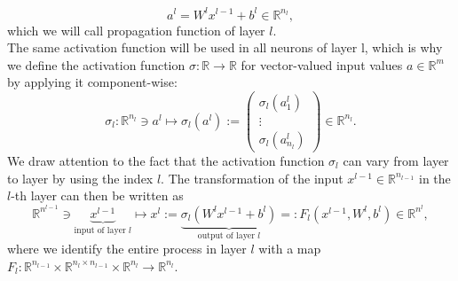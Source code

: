 \begin{equation}
    \label{propagation function}
    a^l = W^l x^{l-1} + b^l \in \mathbb{R}^{n_l},
\end{equation}
which we will call propagation function of layer $l$. \\
The same activation function will be used in all neurons of layer l, which is why we define the activation function $\sigma \colon \mathbb{R} \to \mathbb{R}$ for vector-valued input values $a \in \mathbb{R}^m$ by applying it component-wise:
\begin{equation*}
    \sigma_l \colon \mathbb{R}^{n_l} \ni a^l \mapsto \sigma_l (a^l):= \left(
        \begin{array}
            {c} \sigma_l \left( a^l_{1} \right) \\
            \vdots \\
            \sigma_l \left( a^l_{n_l} \right)
        \end{array}
        \right) \in \mathbb{R}^{n_l}.
\end{equation*}
We draw attention to the fact that the activation function $\sigma_l$ can vary from layer to layer by using the index $l$. The transformation of the input $x^{l-1} \in \mathbb{R}^{n_{l-1}}$ in the $l$-th layer can then be written as
\begin{equation}
    \label{action layer}
    \mathbb{R}^{n^{l-1}} \ni \underbrace{x^{l-1}}_{\text{input of layer } l} \mapsto x^{l}:=\underbrace{\sigma_{l}\left( W^{l} x^{l-1} + b^{l} \right)}_{\text{output of layer } l}=: F_{l} \left(x^{l-1}, W^{l}, b^{l} \right) \in \mathbb{R}^{n^{l}}, 
\end{equation}
where we identify the entire process in layer $l$ with a map $F_l \colon \mathbb{R}^{n_{l-1}} \times \mathbb{R}^{n_l \times n_{l-1}} \times \mathbb{R}^{n_l} \to \mathbb{R}^{n_l}$. \\

